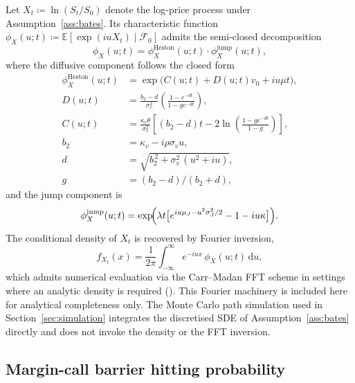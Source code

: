 \documentclass[preprint,12pt,authoryear]{elsarticle}
\newcommand{\EE}{\mathbb{E}}
\newcommand{\FF}{\mathcal{F}}
\newcommand{\dd}{\mathrm{d}}
\theoremstyle{definition}
\begin{document}
Let $X_t \coloneqq \ln(S_t / S_0)$ denote the log-price process
under Assumption~\ref{ass:bates}. Its characteristic function
$\phi_X(u; t) \coloneqq \EE[\exp(i u X_t) \mid \FF_0]$ admits the
semi-closed decomposition
\begin{equation}
    \phi_X(u; t)
    = \phi^{\text{Heston}}_X(u; t) \cdot \phi^{\text{jump}}_X(u; t),
    \label{eq:app-cf-decomposition}
\end{equation}
where the diffusive component follows the \citet{Heston1993}
closed form
\begin{align}
    \phi^{\text{Heston}}_X(u; t)
    &= \exp\!\bigl( C(u; t) + D(u; t) v_0 + i u \mu t \bigr),
    \label{eq:app-heston-cf} \\
    D(u; t)
    &= \frac{b_2 - d}{\sigma_v^{2}}
       \left( \frac{1 - e^{-d t}}{1 - g e^{-d t}} \right),
    \nonumber \\
    C(u; t)
    &= \frac{\kappa_v \theta}{\sigma_v^{2}}
       \left[ (b_2 - d) t
         - 2 \ln\!\left(\frac{1 - g e^{-d t}}{1 - g}\right) \right],
    \nonumber \\
    b_2 &= \kappa_v - i \rho \sigma_v u, \nonumber \\
    d   &= \sqrt{ b_2^{\,2} + \sigma_v^{2}\,(u^2 + i u) }, \nonumber \\
    g   &= (b_2 - d) / (b_2 + d), \nonumber
\end{align}
and the jump component is
\begin{equation}
    \phi^{\text{jump}}_X(u; t)
    = \exp\!\Bigl( \lambda t \bigl[
        e^{i u \mu_J - u^2 \sigma_J^{2} / 2} - 1
        - i u \kappa
      \bigr] \Bigr).
    \label{eq:app-jump-cf}
\end{equation}
The conditional density of $X_t$ is recovered by Fourier
inversion,
\begin{equation}
    f_{X_t}(x)
    = \frac{1}{2\pi}
      \int_{-\infty}^{\infty}
      e^{-i u x}\, \phi_X(u; t) \, \dd u,
    \label{eq:app-fourier-inversion}
\end{equation}
which admits numerical evaluation via the Carr--Madan FFT
scheme in settings where an analytic density is required
(\citealp{Bates1996,Bjork2009}). This Fourier machinery is
included here for analytical completeness only. The Monte Carlo
path simulation used in Section~\ref{sec:simulation} integrates
the discretised SDE of Assumption~\ref{ass:bates} directly and
does not invoke the density or the FFT inversion.

\subsection{Margin-call barrier hitting probability}
\label{app:barrier}
\end{document}
